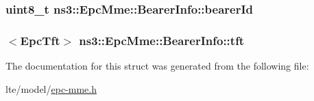 \subsubsection[{\texorpdfstring{bearer\+Id}{bearerId}}]{\setlength{\rightskip}{0pt plus 5cm}uint8\+\_\+t ns3\+::\+Epc\+Mme\+::\+Bearer\+Info\+::bearer\+Id}\hypertarget{structns3_1_1EpcMme_1_1BearerInfo_a5f585f830140108f1cffe7a4d30fb6ea}{}\label{structns3_1_1EpcMme_1_1BearerInfo_a5f585f830140108f1cffe7a4d30fb6ea}
\subsubsection[{\texorpdfstring{tft}{tft}}]{$<${\bf Epc\+Tft}$>$ ns3\+::\+Epc\+Mme\+::\+Bearer\+Info\+::tft}\hypertarget{structns3_1_1EpcMme_1_1BearerInfo_a62c28cf252d968f90d83c0ee5384e900}{}\label{structns3_1_1EpcMme_1_1BearerInfo_a62c28cf252d968f90d83c0ee5384e900}


The documentation for this struct was generated from the following file\+:\begin{DoxyCompactItemize}
\item 
lte/model/\hyperlink{epc-mme_8h}{epc-\/mme.\+h}\end{DoxyCompactItemize}
